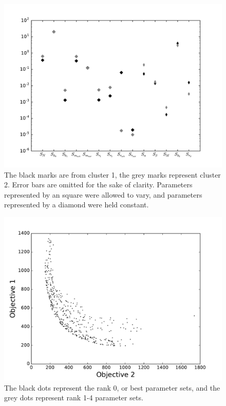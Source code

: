 \documentclass[fleqn,10pt]{wlscirep}
\begin{document}
\begin{figure}[ht]
       \centering
       \includegraphics[width=\linewidth]{figures/MultiobjectiveSenstivityGraph10familiesofNoErrorBarsWithExtendedSensivities}
       \caption{The black marks are from cluster 1, the grey marks represent cluster 2. Error bars are omitted for the sake of clarity. Parameters represented by an square were allowed to vary, and parameters represented by a diamond were held constant.}
        \label{fig:MultiobjectiveSensitivityGraph}
\end{figure} 
\begin{figure}[ht]
       \centering
       \includegraphics[width=\linewidth]{figures/TradeOffCurveFasterCooling}
       \caption{The black dots represent the rank 0, or best parameter sets, and the grey dots represent rank 1-4 parameter sets.}
       \label{fig:tradeoffcurve}
\end{figure}
\end{document}

